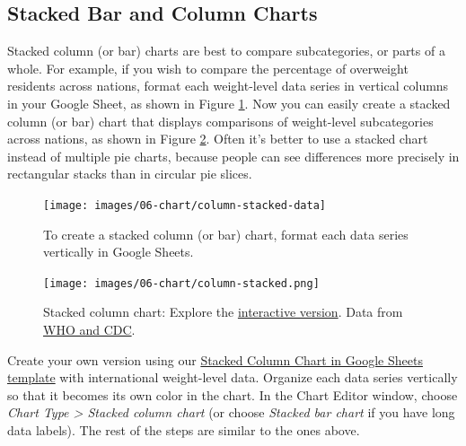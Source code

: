 \documentclass[
  english,
]{book}
\begin{document}
\hypertarget{stacked-bar-and-column-charts}{%
\subsection*{Stacked Bar and Column Charts}\label{stacked-bar-and-column-charts}}

Stacked column (or bar) charts are best to compare subcategories, or parts of a whole. For example, if you wish to compare the percentage of overweight residents across nations, format each weight-level data series in vertical columns in your Google Sheet, as shown in Figure \ref{fig:column-stacked-data}. Now you can easily create a stacked column (or bar) chart that displays comparisons of weight-level subcategories across nations, as shown in Figure \ref{fig:column-stacked}. Often it's better to use a stacked chart instead of multiple pie charts, because people can see differences more precisely in rectangular stacks than in circular pie slices.



\begin{figure}
\texttt{[image: images/06-chart/column-stacked-data]} \caption{To create a stacked column (or bar) chart, format each data series vertically in Google Sheets.}\label{fig:column-stacked-data}
\end{figure}



\begin{figure}
\centering
\texttt{[image: images/06-chart/column-stacked.png]}
\caption{\label{fig:column-stacked}Stacked column chart: Explore the \href{https://docs.google.com/spreadsheets/d/e/2PACX-1vSZrCP99EDqmpYc3VxFF5-Fpryh7KOU3GZ39Gl33OmDw4ecWKXxjrfzHDeQKfandKiUwvDkyF6kwK6L/pubchart?oid=307057605\&format=interactive}{interactive version}. Data from \href{https://docs.google.com/spreadsheets/d/1WS11EK33JCmvCRzSDh9UpP6R7Z2sHglF7ve5iJL6eZk/edit\#gid=735710691}{WHO and CDC}.}
\end{figure}

Create your own version using our \href{https://docs.google.com/spreadsheets/d/1WS11EK33JCmvCRzSDh9UpP6R7Z2sHglF7ve5iJL6eZk/}{Stacked Column Chart in Google Sheets template} with international weight-level data. Organize each data series vertically so that it becomes its own color in the chart. In the Chart Editor window, choose \emph{Chart Type \textgreater{} Stacked column chart} (or choose \emph{Stacked bar chart} if you have long data labels). The rest of the steps are similar to the ones above.
\end{document}
